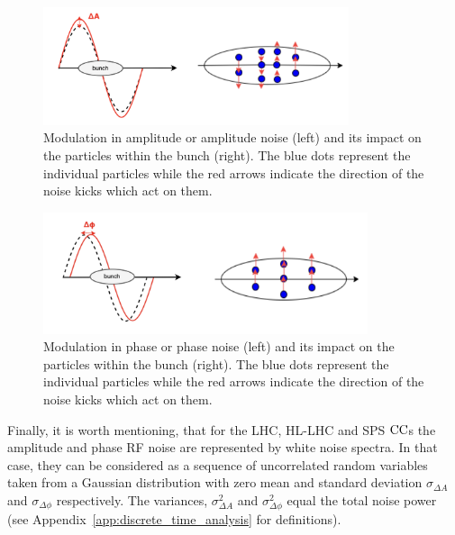 \begin{figure}[!h] %
    \centering         
    \includegraphics[width=0.8\textwidth]{images/Ch3/amplitude_noise.png}
        \caption{Modulation in amplitude or amplitude noise (left) and its impact on the particles within the bunch (right). The blue dots represent the individual particles while the red arrows indicate the direction of the noise kicks which act on them.}
        \label{fig:amplitude_noise}
 \end{figure}

 \begin{figure}[!h] %
    \centering         
    \includegraphics[width=0.85\textwidth]{images/Ch3/phase_noise.png}
        \caption{Modulation in phase or phase noise (left) and its impact on the particles within the bunch (right). The blue dots represent the individual particles while the red arrows indicate the direction of the noise kicks which act on them.}
        \label{fig:phase_noise}
 \end{figure}

 Finally, it is worth mentioning, that for the LHC, HL-LHC and SPS ${\mathrm{CC}}$s the amplitude and phase RF noise are represented by white noise spectra. In that case, they can be considered as a sequence of uncorrelated random variables taken from a Gaussian distribution with zero mean and standard deviation $\sigma_{\Delta A}$ and  $\sigma_{\Delta \phi}$ respectively. The variances,  $\sigma_{\Delta A}^2$ and  $\sigma_{\Delta \phi}^2$ equal the total noise power (see Appendix~\ref{app:discrete_time_analysis} for definitions). %

